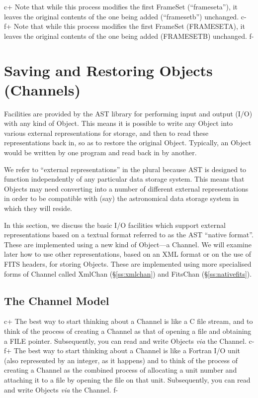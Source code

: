 \documentclass[twoside,11pt]{starlink}
\providecommand{\secref}[1]{\S\ref{#1}}
\begin{document}
{c+
Note that while this process modifies the first FrameSet
(``frameseta''), it leaves the original contents of the one being
added (``framesetb'') unchanged.
c-
f+
Note that while this process modifies the first FrameSet (FRAMESETA),
it leaves the original contents of the one being added (FRAMESETB)
unchanged.
f-


\cleardoublepage
\section{\label{ss:channels}Saving and Restoring Objects (Channels)}

Facilities are provided by the AST library for performing input and
output (I/O) with any kind of Object. This means it is possible
to write any Object into various external representations for
storage, and then to read these representations back in, so as to
restore the original Object. Typically, an Object would be written by
one program and read back in by another.

We refer to ``external representations'' in the plural because AST is
designed to function independently of any particular data storage
system. This means that Objects may need converting into a number of
different external representations in order to be compatible with
(say) the astronomical data storage system in which they will reside.

In this section, we discuss the basic I/O facilities which support
external representations based on a textual format referred to as the AST
``native format''. These are implemented using a new kind of Object---a
Channel. We will examine later how to use other representations, based on
an XML format or on the use of FITS headers, for storing Objects. These
are implemented using more specialised forms of Channel called XmlChan
(\secref{ss:xmlchan}) and FitsChan (\secref{ss:nativefits}).

\subsection{The Channel Model}

c+
The best way to start thinking about a Channel is like a C file
stream, and to think of the process of creating a Channel as that
of opening a file and obtaining a FILE pointer.  Subsequently, you can
read and write Objects \emph{via} the Channel.
c-
f+
The best way to start thinking about a Channel is like a Fortran I/O
unit (also represented by an integer, as it happens) and to think of
the process of creating a Channel as the combined process of
allocating a unit number and attaching it to a file by opening the
file on that unit. Subsequently, you can read and write Objects
\emph{via} the Channel.
f-

}
\end{document}
